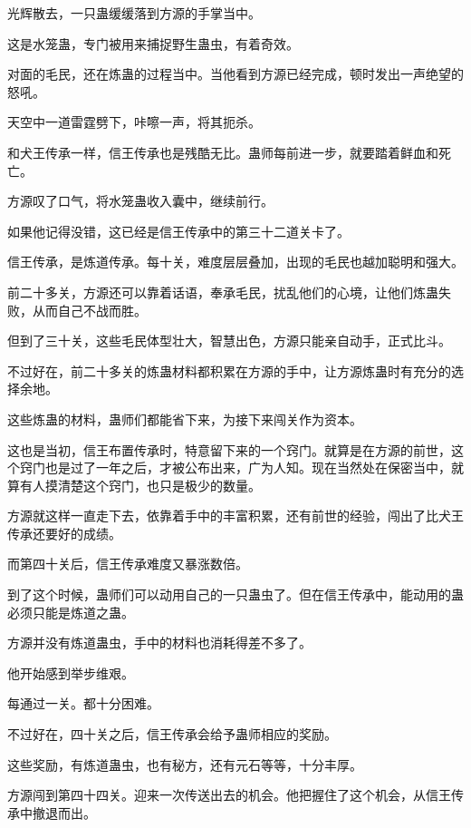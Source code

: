 
\begin{this_body}



光辉散去，一只蛊缓缓落到方源的手掌当中。

这是水笼蛊，专门被用来捕捉野生蛊虫，有着奇效。

对面的毛民，还在炼蛊的过程当中。当他看到方源已经完成，顿时发出一声绝望的怒吼。

天空中一道雷霆劈下，咔嚓一声，将其扼杀。

和犬王传承一样，信王传承也是残酷无比。蛊师每前进一步，就要踏着鲜血和死亡。

方源叹了口气，将水笼蛊收入囊中，继续前行。

如果他记得没错，这已经是信王传承中的第三十二道关卡了。

信王传承，是炼道传承。每十关，难度层层叠加，出现的毛民也越加聪明和强大。

前二十多关，方源还可以靠着话语，奉承毛民，扰乱他们的心境，让他们炼蛊失败，从而自己不战而胜。

但到了三十关，这些毛民体型壮大，智慧出色，方源只能亲自动手，正式比斗。

不过好在，前二十多关的炼蛊材料都积累在方源的手中，让方源炼蛊时有充分的选择余地。

这些炼蛊的材料，蛊师们都能省下来，为接下来闯关作为资本。

这也是当初，信王布置传承时，特意留下来的一个窍门。就算是在方源的前世，这个窍门也是过了一年之后，才被公布出来，广为人知。现在当然处在保密当中，就算有人摸清楚这个窍门，也只是极少的数量。

方源就这样一直走下去，依靠着手中的丰富积累，还有前世的经验，闯出了比犬王传承还要好的成绩。

而第四十关后，信王传承难度又暴涨数倍。

到了这个时候，蛊师们可以动用自己的一只蛊虫了。但在信王传承中，能动用的蛊必须只能是炼道之蛊。

方源并没有炼道蛊虫，手中的材料也消耗得差不多了。

他开始感到举步维艰。

每通过一关。都十分困难。

不过好在，四十关之后，信王传承会给予蛊师相应的奖励。

这些奖励，有炼道蛊虫，也有秘方，还有元石等等，十分丰厚。

方源闯到第四十四关。迎来一次传送出去的机会。他把握住了这个机会，从信王传承中撤退而出。


\end{this_body}
